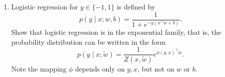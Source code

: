 \documentclass{article}
\begin{document}
\begin{enumerate}
\item
Logistic regression for $y\in \{-1,1\}$ is defined by
$$p(y \mid x; w,b) = \frac{1}{1+e^{-y (x^\top w + b)}}.$$
Show that logistic regression is in the exponential family, that is, the probability distribution can be written in the form
$$p(y \mid x; \tilde w) = \frac{1}{Z(x,\tilde w)} e^{\phi(y,x)^\top \tilde w}.$$
Note the mapping $\phi$ depends only on $y, x$, but not on $w$ or $b$.
\end{enumerate}
\end{document}
